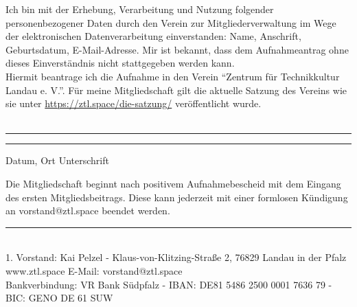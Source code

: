 \documentclass[a4paper, 11pt]{scrartcl}
\begin{document}
Ich bin mit der Erhebung, Verarbeitung und Nutzung folgender personenbezogener Daten durch den Verein zur Mitgliederverwaltung im Wege der elektronischen Datenverarbeitung einverstanden: Name, Anschrift, Geburtsdatum, E-Mail-Adresse. Mir ist bekannt, dass dem Aufnahmeantrag ohne dieses Einverständnis nicht stattgegeben werden kann.\\

Hiermit beantrage ich die Aufnahme in den Verein "`Zentrum für Technikkultur Landau e. V."'. Für meine Mitgliedschaft gilt die aktuelle Satzung des Vereins wie sie unter \url{https://ztl.space/die-satzung/} veröffentlicht wurde.\\

\vspace{50pt}
\\
\noindent\rule{5cm}{.4pt}\hfill\rule{5cm}{.4pt}\par
\noindent Datum, Ort \hspace{9.8cm} Unterschrift
\vspace{50pt}

Die Mitgliedschaft beginnt nach positivem Aufnahmebescheid mit dem Eingang des ersten Mitgliedsbeitrags. Diese kann jederzeit mit einer formlosen Kündigung an vorstand@ztl.space beendet werden.

\vspace{50pt}
\begin{center}
\rule{15cm}{.4pt}\\ 
1. Vorstand: Kai Pelzel - Klaus-von-Klitzing-Straße 2, 76829 Landau in der Pfalz \\
www.ztl.space E-Mail: vorstand@ztl.space \\
Bankverbindung: VR Bank Südpfalz - IBAN: DE81 5486 2500 0001 7636 79 - BIC: GENO DE 61 SUW

\end{center}
\end{document}
